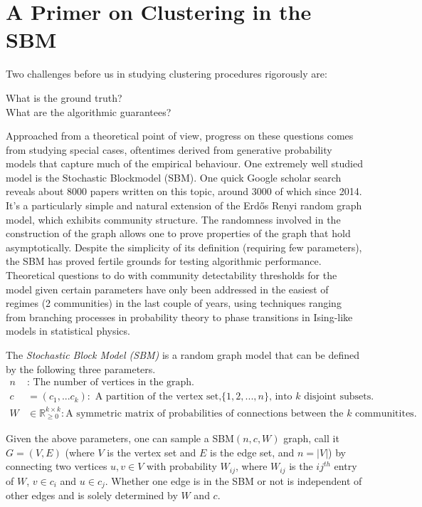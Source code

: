 \chapter{A Primer on Clustering in the SBM}

Two challenges before us in studying clustering procedures rigorously are: 
\begin{center}
What is the ground truth?\\

What are the algorithmic guarantees?
\end{center}
Approached from a theoretical point of view, progress on these questions comes from studying special cases, oftentimes derived from generative probability models that capture much of the empirical behaviour.  One extremely well studied model is the Stochastic Blockmodel (SBM).  One quick Google scholar search reveals about 8000 papers written on this topic, around 3000 of which since 2014.  It's a particularly simple and natural extension of the Erd\H{o}s Renyi random graph model, which exhibits community structure.  The randomness involved in the construction of the graph allows one to prove properties of the graph that hold asymptotically.  Despite the simplicity of its definition (requiring few parameters), the SBM has proved fertile grounds for testing algorithmic performance.  Theoretical questions to do with community detectability thresholds for the model given certain parameters have only been addressed in the easiest of regimes (2 communities)  in the last couple of years, using techniques ranging from branching processes in probability theory to phase transitions in Ising-like models in statistical physics.  

\begin{definition}The \textit{Stochastic Block Model (SBM)} is a random graph model that can be defined by the following three parameters.
\begin{align*}
    n & : \text{ The number of vertices in the graph. }\\
    c & =(c_1, ...c_k): \text{ A partition of the vertex set,} \{1,2, ...,n\} \text{, into } k \text{ disjoint subsets. }\\
    W & \in \mathbb{R}^{k \times k}_{\geq 0}: \text{A symmetric matrix of probabilities of connections between the } k \text{ communitites.}
\end{align*}

Given the above parameters, one can sample a SBM$(n, c, W)$ graph, call it $G = (V, E)$ (where $V$ is the vertex set and $E$ is the edge set, and $n= |V|$) by connecting two vertices $u, v \in V$ with probability $W_{ij}$, where $W_{ij}$ is the $ij^{th}$ entry of $W$, $v \in c_i$ and $u \in c_j$.  Whether one edge is in the SBM or not is independent of other edges and is solely determined by $W$ and $c$.  
\end{definition}

